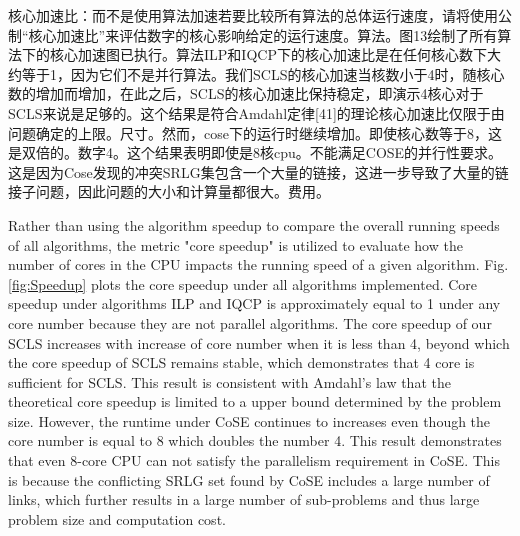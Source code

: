核心加速比：而不是使用算法加速若要比较所有算法的总体运行速度，请将使用公制“核心加速比”来评估数字的核心影响给定的运行速度。算法。图13绘制了所有算法下的核心加速图已执行。算法ILP和IQCP下的核心加速比是在任何核心数下大约等于1，因为它们不是并行算法。我们SCLS的核心加速当核数小于4时，随核心数的增加而增加，在此之后，SCLS的核心加速比保持稳定，即演示4核心对于SCLS来说是足够的。这个结果是符合Amdahl定律[41]的理论核心加速比仅限于由问题确定的上限。尺寸。然而，cose下的运行时继续增加。即使核心数等于8，这是双倍的。数字4。这个结果表明即使是8核cpu。不能满足COSE的并行性要求。这是因为Cose发现的冲突SRLG集包含一个大量的链接，这进一步导致了大量的链接子问题，因此问题的大小和计算量都很大。费用。


Rather than using the algorithm speedup to compare the overall running speeds of all algorithms, the metric "core speedup" is utilized to evaluate how the number of cores in the CPU impacts the running speed of a given algorithm.
Fig.\ref{fig:Speedup} plots the core speedup under all algorithms implemented.
Core speedup under algorithms ILP and IQCP is  approximately equal to 1 under any core number because they are not parallel algorithms. The core speedup of our SCLS increases with increase of core number when it is less than 4, beyond which the core speedup of SCLS remains stable, which demonstrates that 4 core is sufficient for SCLS. This result is consistent with Amdahl's law\cite{amdahl1967validity} that the theoretical core speedup is limited to a upper bound determined by the problem size. However, the runtime under CoSE continues to increases even though the core number is  equal to 8 which doubles the number 4. This result demonstrates that even 8-core CPU can not satisfy the parallelism requirement in CoSE. This is because the conflicting SRLG set found by CoSE includes  a large number of links,  which further results in a large number of sub-problems  and thus large problem size and  computation cost.


%

